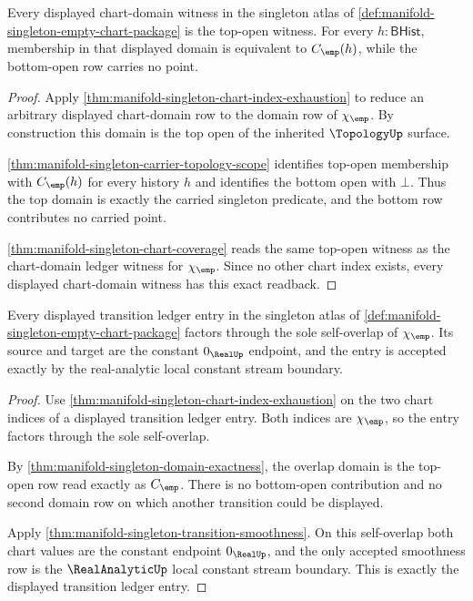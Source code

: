 \begin{theorem}
\label{thm:manifold-singleton-domain-exactness}
Every displayed chart-domain witness in the singleton atlas of
\autoref{def:manifold-singleton-empty-chart-package} is the top-open witness.
For every $h:\mathsf{BHist}$, membership in that displayed domain is equivalent
to $C_{\emp}(h)$, while the bottom-open row carries no point.
\end{theorem}
\begin{proof}
Apply \autoref{thm:manifold-singleton-chart-index-exhaustion} to reduce an
arbitrary displayed chart-domain row to the domain row of $\chi_{\emp}$. By
construction this domain is the top open of the inherited $\TopologyUp$
surface.

\autoref{thm:manifold-singleton-carrier-topology-scope} identifies top-open
membership with $C_{\emp}(h)$ for every history $h$ and identifies the bottom
open with $\bot$. Thus the top domain is exactly the carried singleton
predicate, and the bottom row contributes no carried point.

\autoref{thm:manifold-singleton-chart-coverage} reads the same top-open witness
as the chart-domain ledger witness for $\chi_{\emp}$. Since no other chart
index exists, every displayed chart-domain witness has this exact readback.
\end{proof}

\begin{theorem}
\label{thm:manifold-singleton-transition-ledger-exhaustion}
Every displayed transition ledger entry in the singleton atlas of
\autoref{def:manifold-singleton-empty-chart-package} factors through the sole
self-overlap of $\chi_{\emp}$. Its source and target are the constant
$0_{\RealUp}$ endpoint, and the entry is accepted exactly by the
real-analytic local constant stream boundary.
\end{theorem}
\begin{proof}
Use \autoref{thm:manifold-singleton-chart-index-exhaustion} on the two chart
indices of a displayed transition ledger entry. Both indices are
$\chi_{\emp}$, so the entry factors through the sole self-overlap.

By \autoref{thm:manifold-singleton-domain-exactness}, the overlap domain is the
top-open row read exactly as $C_{\emp}$. There is no bottom-open contribution
and no second domain row on which another transition could be displayed.

Apply \autoref{thm:manifold-singleton-transition-smoothness}. On this
self-overlap both chart values are the constant endpoint $0_{\RealUp}$, and
the only accepted smoothness row is the $\RealAnalyticUp$ local constant stream
boundary. This is exactly the displayed transition ledger entry.
\end{proof}

